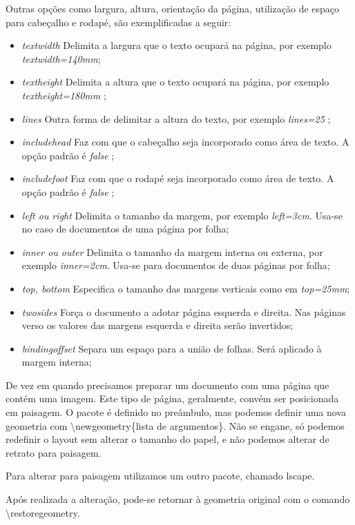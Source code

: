 Outras opções como largura, altura, orientação da página, utilização de espaço para cabeçalho e rodapé, são exemplificadas a seguir:
\begin{itemize}
    \item \emph{textwidth} Delimita a largura que o texto ocupará na página, por exemplo \emph{textwidth=140mm};
    \item \emph{textheight} Delimita a altura que o texto ocupará na página, por exemplo \emph{textheight=180mm} ;
    \item \emph{lines} Outra forma de delimitar a altura do texto, por exemplo \emph{lines=25} ;
    \item \emph{includehead} Faz com que o cabeçalho seja incorporado como área de texto. A opção padrão é \emph{false} ;
    \item \emph{includefoot} Faz com que o rodapé seja incorporado como área de texto. A opção padrão é \emph{false} ;
    \item \emph{left ou right} Delimita o tamanho da margem, por exemplo \emph{left=3cm}. Usa-se no caso de documentos de uma página por folha;
    \item \emph{inner ou outer} Delimita o tamanho da margem interna ou externa, por exemplo \emph{inner=2cm}. Usa-se para documentos de duas páginas por folha;
    \item \emph{top, bottom} Especifica o tamanho das margens verticais como em \emph{top=25mm};
    \item \emph{twosides} Força o documento a adotar página esquerda e direita. Nas páginas verso os valores das margens esquerda e direita serão invertidos;
    \item \emph{bindingoffset} Separa um espaço para a união de folhas. Será aplicado à margem interna;
\end{itemize}

De vez em quando precisamos preparar um documento com uma página que contém uma imagem.
Este tipo de página, geralmente, convém ser posicionada em paisagem.
O pacote é definido no preâmbulo, mas podemos definir uma nova geometria com \textbackslash newgeometry\{lista de argumentos\}.
Não se engane, só podemos redefinir o layout sem alterar o tamanho do papel, e não podemos alterar de retrato para paisagem.

Para alterar para paisagem utilizamos um outro pacote, chamado lscape.

Após realizada a alteração, pode-se retornar à geometria original com o comando \textbackslash restoregeometry.

\newpage
